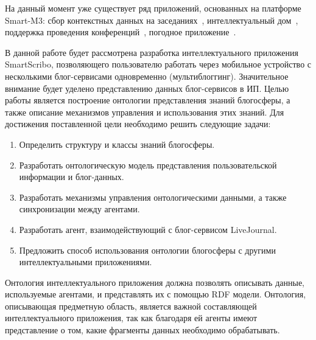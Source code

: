 На данный момент уже существует ряд приложений, основанных на платформе Smart-M3: сбор контекстных данных на заседаниях~\cite{oliver:context}, интеллектуальный дом~\cite{framling:smart}, поддержка проведения конференций~\cite{scs}, погодное приложение~\cite{m3weather}. 

В данной работе будет рассмотрена разработка интеллектуального приложения SmartScribo, позволяющего пользователю работать через мобильное устройство с несколькими блог-сервисами одновременно (мультиблоггинг).
Значительное внимание будет уделено представлению данных блог-сервисов в ИП.
Целью работы является построение онтологии представления знаний блогосферы, а также описание механизмов управления и использования этих знаний.
Для достижения поставленной цели необходимо решить следующие задачи:
\begin{enumerate}
\item
Определить структуру и классы знаний блогосферы.
\item
Разработать онтологическую модель представления пользовательской информации и блог-данных.
\item
Разработать механизмы управления онтологическими данными, а также синхронизации между агентами.
\item
Разработать агент, взаимодействующий с блог-сервисом LiveJournal.
\item
Предложить способ использования онтологии блогосферы с другими интеллектуальными приложениями.
\end{enumerate}

Онтология интеллектуального приложения должна позволять описывать данные, используемые агентами, и представлять их с помощью RDF модели. Онтология, описывающая предметную область, является важной составляющей интеллектуального приложения, так как благодаря ей агенты имеют представление о том, какие фрагменты данных необходимо обрабатывать.


